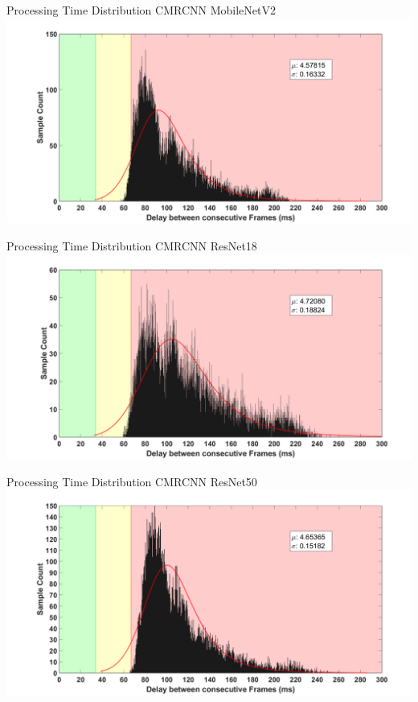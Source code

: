\documentclass[18pt]{beamer}
\begin{document}
\begin{frame}{Processing Time Distribution CMRCNN MobileNetV2}
\includegraphics[width=\textwidth]{figures/graphs/dist_cmrcnn_mobilenetv2.png}
\end{frame}

\begin{frame}{Processing Time Distribution CMRCNN ResNet18}
\includegraphics[width=\textwidth]{figures/graphs/dist_cmrcnn_resnet18.png}
\end{frame}

\begin{frame}{Processing Time Distribution CMRCNN ResNet50}
\includegraphics[width=\textwidth]{figures/graphs/dist_cmrcnn_resnet50.png}
\end{frame}
\end{document}
